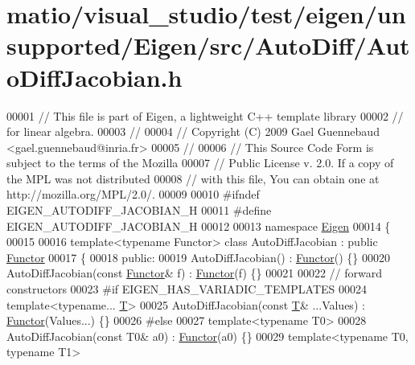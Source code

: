 \hypertarget{matio_2visual__studio_2test_2eigen_2unsupported_2_eigen_2src_2_auto_diff_2_auto_diff_jacobian_8h_source}{}\section{matio/visual\+\_\+studio/test/eigen/unsupported/\+Eigen/src/\+Auto\+Diff/\+Auto\+Diff\+Jacobian.h}
\label{matio_2visual__studio_2test_2eigen_2unsupported_2_eigen_2src_2_auto_diff_2_auto_diff_jacobian_8h_source}

\begin{DoxyCode}
00001 \textcolor{comment}{// This file is part of Eigen, a lightweight C++ template library}
00002 \textcolor{comment}{// for linear algebra.}
00003 \textcolor{comment}{//}
00004 \textcolor{comment}{// Copyright (C) 2009 Gael Guennebaud <gael.guennebaud@inria.fr>}
00005 \textcolor{comment}{//}
00006 \textcolor{comment}{// This Source Code Form is subject to the terms of the Mozilla}
00007 \textcolor{comment}{// Public License v. 2.0. If a copy of the MPL was not distributed}
00008 \textcolor{comment}{// with this file, You can obtain one at http://mozilla.org/MPL/2.0/.}
00009 
00010 \textcolor{preprocessor}{#ifndef EIGEN\_AUTODIFF\_JACOBIAN\_H}
00011 \textcolor{preprocessor}{#define EIGEN\_AUTODIFF\_JACOBIAN\_H}
00012 
00013 \textcolor{keyword}{namespace }\hyperlink{namespace_eigen}{Eigen}
00014 \{
00015 
00016 \textcolor{keyword}{template}<\textcolor{keyword}{typename} Functor> \textcolor{keyword}{class }AutoDiffJacobian : \textcolor{keyword}{public} \hyperlink{struct_functor}{Functor}
00017 \{
00018 \textcolor{keyword}{public}:
00019   AutoDiffJacobian() : \hyperlink{struct_functor}{Functor}() \{\}
00020   AutoDiffJacobian(\textcolor{keyword}{const} \hyperlink{struct_functor}{Functor}& f) : \hyperlink{struct_functor}{Functor}(f) \{\}
00021 
00022   \textcolor{comment}{// forward constructors}
00023 \textcolor{preprocessor}{#if EIGEN\_HAS\_VARIADIC\_TEMPLATES}
00024   \textcolor{keyword}{template}<\textcolor{keyword}{typename}... \hyperlink{group___sparse_core___module_class_eigen_1_1_triplet}{T}>
00025   AutoDiffJacobian(\textcolor{keyword}{const} \hyperlink{group___sparse_core___module_class_eigen_1_1_triplet}{T}& ...Values) : \hyperlink{struct_functor}{Functor}(Values...) \{\}
00026 \textcolor{preprocessor}{#else}
00027   \textcolor{keyword}{template}<\textcolor{keyword}{typename} T0>
00028   AutoDiffJacobian(\textcolor{keyword}{const} T0& a0) : \hyperlink{struct_functor}{Functor}(a0) \{\}
00029   \textcolor{keyword}{template}<\textcolor{keyword}{typename} T0, \textcolor{keyword}{typename} T1>

\end{DoxyCode}
